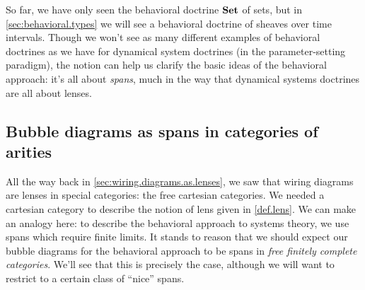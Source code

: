 \documentclass[DynamicalBook]{subfiles}
\begin{document}
So far, we have only seen the behavioral doctrine $\textbf{Set}$ of sets, but in
\cref{sec:behavioral.types} we will see a behavioral doctrine of sheaves over
time intervals. Though we won't see as many different examples of behavioral
doctrines as we have for dynamical system doctrines (in the parameter-setting paradigm), the notion can help us
clarify the basic ideas of the behavioral approach: it's all about \emph{spans},
much in the way that dynamical systems doctrines are all about lenses.

\subsection{Bubble diagrams as spans in categories of arities}\label{sec:behavioral.diagrams}


All the way back in \cref{sec:wiring.diagrams.as.lenses}, we saw that wiring
diagrams are lenses in special categories: the free cartesian categories. We
needed a cartesian category to describe the notion of lens given in
\cref{def.lens}. We can make an analogy here: to describe the behavioral
approach to systems theory, we use spans which require finite limits. It stands
to reason that we should expect our bubble diagrams for the behavioral approach
to be spans in \emph{free finitely complete categories}. We'll see that this is
precisely the case, although we will want to restrict to a certain class of
``nice'' spans.
\end{document}
